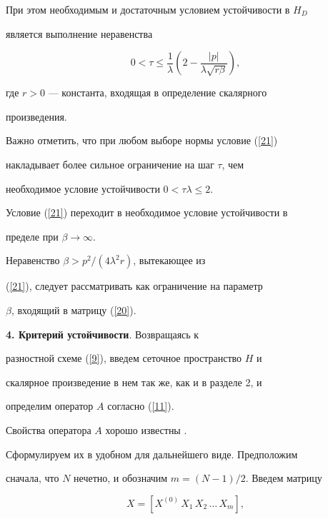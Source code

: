 При этом необходимым и достаточным условием устойчивости в $H_{D}$


является выполнение неравенства


\begin{equation}\label{21}


0 < \tau \leqslant \frac{1} {\lambda}\left({2-\frac{{| p


|}} {{\lambda \sqrt {r\beta}}}} \right),


\end{equation}


где $r>0$ --- константа, входящая в определение скалярного


произведения.





Важно отметить, что при любом выборе нормы условие (\ref{21})


накладывает более сильное ограничение на шаг $\tau$, чем


необходимое условие устойчивости $0 < \tau \lambda \leqslant 2$.


Условие (\ref{21}) переходит в необходимое условие устойчивости в


пределе при $\beta \to \infty $.





Неравенство $\beta >p^2/(4\lambda ^2 r)$, вытекающее из


(\ref{21}), следует рассматривать как ограничение на параметр


$\beta$, входящий в матрицу (\ref{20}).


\medskip





{\bf 4. Критерий устойчивости}. Возвращаясь к


разностной схеме (\ref{9}), введем сеточное пространство $H$ и


скалярное произведение в нем так же, как и в разделе 2, и


определим оператор $A$ согласно (\ref{11}).





Свойства оператора $A$ хорошо известны \cite{10}.


Сформулируем их в удобном для дальнейшего виде. Предположим


сначала, что $N$ нечетно, и обозначим $m=(N-1)/2$. Введем матрицу


\begin{equation}\label{23}


X=[ {X^{(0)}\,X_1\,X_2\, \dotsc\,X_m}],


\end{equation}


